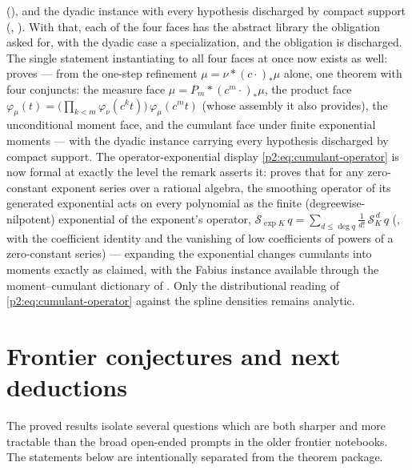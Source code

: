 \documentclass[11pt,oneside]{article}
\numberwithin{equation}{section}
\theoremstyle{definition}
\theoremstyle{remark}
\begin{document}
(), and the dyadic instance with every
hypothesis discharged by compact support
(,
).  With that, each of the four
faces has the abstract library the obligation asked for, with the dyadic case a
specialization, and the obligation is discharged.  The single statement instantiating
to all four faces at once now exists as well:  proves
 --- from the one-step refinement
\(\mu=\nu\ast(c\cdot)_*\mu\) alone, one theorem with four conjuncts: the measure face
\(\mu=P_m\ast(c^m\cdot)_*\mu\), the product face \(\varphi_\mu(t)=\bigl(\prod_{k<m}\varphi_\nu(c^kt)\bigr)\,\varphi_\mu(c^mt)\)
(whose assembly  it also provides), the unconditional
moment face, and the cumulant face under finite exponential moments --- with the dyadic
instance  carrying every hypothesis
discharged by compact support.  The operator-exponential display
\eqref{p2:eq:cumulant-operator} is now formal at exactly the level the remark asserts it:
 proves that for any zero-constant exponent
series over a rational algebra, the smoothing operator of its generated exponential
acts on every polynomial as the finite (degreewise-nilpotent) exponential of the
exponent's operator,
\(\mathcal S_{\exp K}\,q=\sum_{d\le\deg q}\tfrac1{d!}\,\mathcal S_K^{\,d}\,q\)
(, with the coefficient identity
 and the vanishing of low coefficients
of powers of a zero-constant series) --- expanding the exponential changes cumulants
into moments exactly as claimed, with the Fabius instance available through the
moment--cumulant dictionary of .  Only the
distributional reading of \eqref{p2:eq:cumulant-operator} against the spline densities
remains analytic.

\section{Frontier conjectures and next deductions}
\label{p2:sec:frontiers}

The proved results isolate several questions which are both sharper and more tractable than
the broad open-ended prompts in the older frontier notebooks.  The statements below are
intentionally separated from the theorem package.
\end{document}
